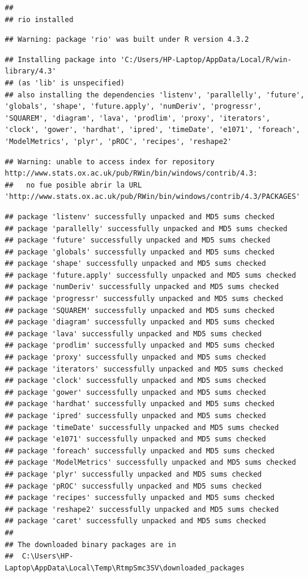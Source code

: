 \documentclass[
]{article}
\begin{document}
\begin{verbatim}
## 
## rio installed
\end{verbatim}

\begin{verbatim}
## Warning: package 'rio' was built under R version 4.3.2
\end{verbatim}

\begin{verbatim}
## Installing package into 'C:/Users/HP-Laptop/AppData/Local/R/win-library/4.3'
## (as 'lib' is unspecified)
## also installing the dependencies 'listenv', 'parallelly', 'future', 'globals', 'shape', 'future.apply', 'numDeriv', 'progressr', 'SQUAREM', 'diagram', 'lava', 'prodlim', 'proxy', 'iterators', 'clock', 'gower', 'hardhat', 'ipred', 'timeDate', 'e1071', 'foreach', 'ModelMetrics', 'plyr', 'pROC', 'recipes', 'reshape2'
\end{verbatim}

\begin{verbatim}
## Warning: unable to access index for repository http://www.stats.ox.ac.uk/pub/RWin/bin/windows/contrib/4.3:
##   no fue posible abrir la URL 'http://www.stats.ox.ac.uk/pub/RWin/bin/windows/contrib/4.3/PACKAGES'
\end{verbatim}

\begin{verbatim}
## package 'listenv' successfully unpacked and MD5 sums checked
## package 'parallelly' successfully unpacked and MD5 sums checked
## package 'future' successfully unpacked and MD5 sums checked
## package 'globals' successfully unpacked and MD5 sums checked
## package 'shape' successfully unpacked and MD5 sums checked
## package 'future.apply' successfully unpacked and MD5 sums checked
## package 'numDeriv' successfully unpacked and MD5 sums checked
## package 'progressr' successfully unpacked and MD5 sums checked
## package 'SQUAREM' successfully unpacked and MD5 sums checked
## package 'diagram' successfully unpacked and MD5 sums checked
## package 'lava' successfully unpacked and MD5 sums checked
## package 'prodlim' successfully unpacked and MD5 sums checked
## package 'proxy' successfully unpacked and MD5 sums checked
## package 'iterators' successfully unpacked and MD5 sums checked
## package 'clock' successfully unpacked and MD5 sums checked
## package 'gower' successfully unpacked and MD5 sums checked
## package 'hardhat' successfully unpacked and MD5 sums checked
## package 'ipred' successfully unpacked and MD5 sums checked
## package 'timeDate' successfully unpacked and MD5 sums checked
## package 'e1071' successfully unpacked and MD5 sums checked
## package 'foreach' successfully unpacked and MD5 sums checked
## package 'ModelMetrics' successfully unpacked and MD5 sums checked
## package 'plyr' successfully unpacked and MD5 sums checked
## package 'pROC' successfully unpacked and MD5 sums checked
## package 'recipes' successfully unpacked and MD5 sums checked
## package 'reshape2' successfully unpacked and MD5 sums checked
## package 'caret' successfully unpacked and MD5 sums checked
## 
## The downloaded binary packages are in
##  C:\Users\HP-Laptop\AppData\Local\Temp\RtmpSmc3SV\downloaded_packages
\end{verbatim}
\end{document}

